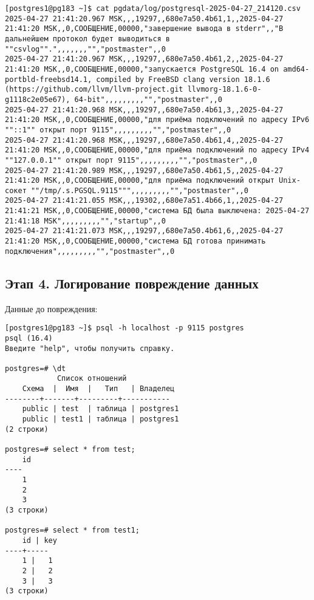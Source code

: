 \begin{verbatim}
[postgres1@pg183 ~]$ cat pgdata/log/postgresql-2025-04-27_214120.csv
2025-04-27 21:41:20.967 MSK,,,19297,,680e7a50.4b61,1,,2025-04-27 21:41:20 MSK,,0,СООБЩЕНИЕ,00000,"завершение вывода в stderr",,"В дальнейшем протокол будет выводиться в ""csvlog"".",,,,,,,"","postmaster",,0
2025-04-27 21:41:20.967 MSK,,,19297,,680e7a50.4b61,2,,2025-04-27 21:41:20 MSK,,0,СООБЩЕНИЕ,00000,"запускается PostgreSQL 16.4 on amd64-portbld-freebsd14.1, compiled by FreeBSD clang version 18.1.6 (https://github.com/llvm/llvm-project.git llvmorg-18.1.6-0-g1118c2e05e67), 64-bit",,,,,,,,,"","postmaster",,0
2025-04-27 21:41:20.968 MSK,,,19297,,680e7a50.4b61,3,,2025-04-27 21:41:20 MSK,,0,СООБЩЕНИЕ,00000,"для приёма подключений по адресу IPv6 ""::1"" открыт порт 9115",,,,,,,,,"","postmaster",,0
2025-04-27 21:41:20.968 MSK,,,19297,,680e7a50.4b61,4,,2025-04-27 21:41:20 MSK,,0,СООБЩЕНИЕ,00000,"для приёма подключений по адресу IPv4 ""127.0.0.1"" открыт порт 9115",,,,,,,,,"","postmaster",,0
2025-04-27 21:41:20.989 MSK,,,19297,,680e7a50.4b61,5,,2025-04-27 21:41:20 MSK,,0,СООБЩЕНИЕ,00000,"для приёма подключений открыт Unix-сокет ""/tmp/.s.PGSQL.9115""",,,,,,,,,"","postmaster",,0
2025-04-27 21:41:21.055 MSK,,,19302,,680e7a51.4b66,1,,2025-04-27 21:41:21 MSK,,0,СООБЩЕНИЕ,00000,"система БД была выключена: 2025-04-27 21:41:18 MSK",,,,,,,,,"","startup",,0
2025-04-27 21:41:21.073 MSK,,,19297,,680e7a50.4b61,6,,2025-04-27 21:41:20 MSK,,0,СООБЩЕНИЕ,00000,"система БД готова принимать подключения",,,,,,,,,"","postmaster",,0
\end{verbatim}

\subsection{Этап 4. Логирование повреждение данных}

Данные до повреждения:
\begin{verbatim}
[postgres1@pg183 ~]$ psql -h localhost -p 9115 postgres
psql (16.4)
Введите "help", чтобы получить справку.

postgres=# \dt
            Список отношений
    Схема  |  Имя  |   Тип   | Владелец
--------+-------+---------+-----------
    public | test  | таблица | postgres1
    public | test1 | таблица | postgres1
(2 строки)

postgres=# select * from test;
    id
----
    1
    2
    3
(3 строки)

postgres=# select * from test1;
    id | key
----+-----
    1 |   1
    2 |   2
    3 |   3
(3 строки)
\end{verbatim}

